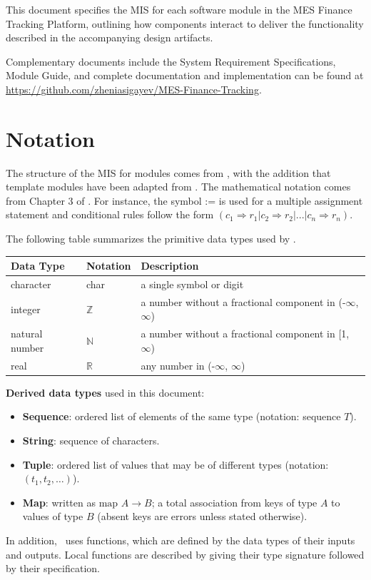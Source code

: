 \documentclass[12pt, titlepage]{article}
\begin{document}
This document specifies the MIS for each software module in the MES Finance Tracking Platform, outlining how components interact to deliver the functionality described in the accompanying design artifacts.

Complementary documents include the System Requirement Specifications, Module Guide, and complete documentation and implementation can be found at \url{https://github.com/zheniasigayev/MES-Finance-Tracking}.

\section{Notation}

The structure of the MIS for modules comes from \citet{HoffmanAndStrooper1995},
with the addition that template modules have been adapted from
\cite{GhezziEtAl2003}.  The mathematical notation comes from Chapter 3 of
\citet{HoffmanAndStrooper1995}.  For instance, the symbol := is used for a
multiple assignment statement and conditional rules follow the form $(c_1
\Rightarrow r_1 | c_2 \Rightarrow r_2 | ... | c_n \Rightarrow r_n )$.

The following table summarizes the primitive data types used by \progname. 

\begin{center}
\renewcommand{\arraystretch}{1.2}
\noindent 
\begin{tabular}{l l p{7.5cm}} 
\toprule 
\textbf{Data Type} & \textbf{Notation} & \textbf{Description}\\ 
\midrule
character & char & a single symbol or digit\\
integer & $\mathbb{Z}$ & a number without a fractional component in (-$\infty$, $\infty$) \\
natural number & $\mathbb{N}$ & a number without a fractional component in [1, $\infty$) \\
real & $\mathbb{R}$ & any number in (-$\infty$, $\infty$)\\
\bottomrule
\end{tabular} 
\end{center}

\noindent
\noindent
\textbf{Derived data types} used in this document:
\begin{itemize}
  \item \textbf{Sequence}: ordered list of elements of the same type (notation: sequence $T$).
  \item \textbf{String}: sequence of characters.
  \item \textbf{Tuple}: ordered list of values that may be of different types (notation: $(t_1, t_2, \dots)$).
  \item \textbf{Map}: written as $\text{map } A \rightarrow B$; a total association from keys of type $A$ to values of type $B$ (absent keys are errors unless stated otherwise).
\end{itemize}
In addition, \progname \ uses functions, which are defined by the data types of their inputs and outputs. Local functions are described by giving their type signature followed by their specification.
\end{document}
